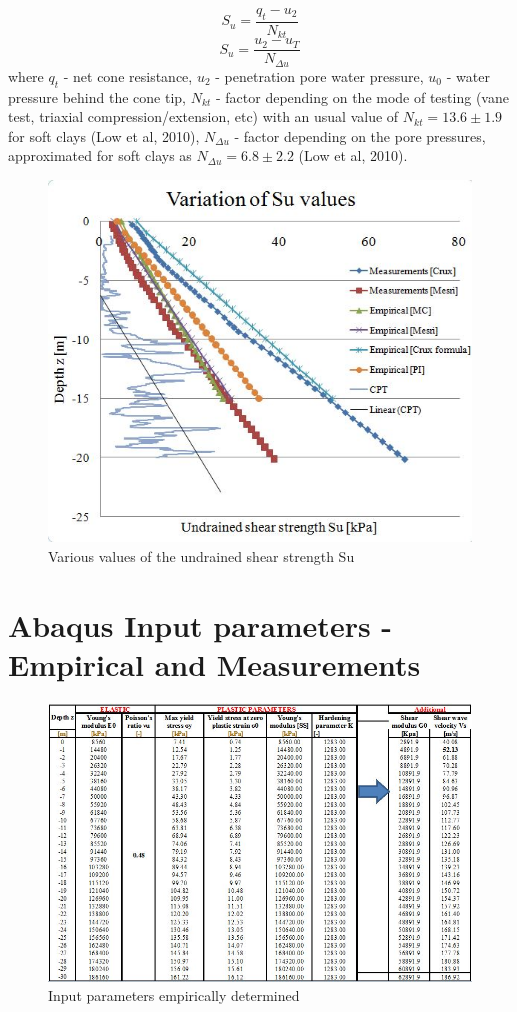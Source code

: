 \documentclass[12pt,a4paper]{report}
\begin{document}
\begin{enumerate}
\begin{equation}
S_u=\frac{q_t-u_2}{N_{kt}}
\end{equation}
\begin{equation}
S_u=\frac{u_2-u_T}{N_{\Delta u}}
\end{equation}
where $q_t$ - net cone resistance, $u_2$ - penetration pore water pressure, $u_0$ - water pressure behind the cone tip, $N_{kt}$ - factor depending on the mode of testing (vane test, triaxial compression/extension, etc) with an usual value of $N_{kt}=13.6\pm1.9$ for soft clays (Low et al, 2010), $N_{\Delta u}$ - factor depending on the pore pressures, approximated for soft clays as $N_{\Delta u}=6.8\pm2.2$ (Low et al, 2010).
\end{enumerate}
\begin{figure}[h!]
	\centering
	\includegraphics[width=0.45\linewidth]{"Su"}
	\caption{Various values of the undrained shear strength Su}
	\label{Su_2}
\end{figure}
	
\newpage
\chapter{Abaqus Input parameters - Empirical and Measurements} \label{App:AppendixF}

\begin{figure}[h!]
	\centering
	\includegraphics[width=1\linewidth]{"empirical"}
	\caption{Input parameters empirically determined}
	\label{empirical}
\end{figure}
\end{document}
